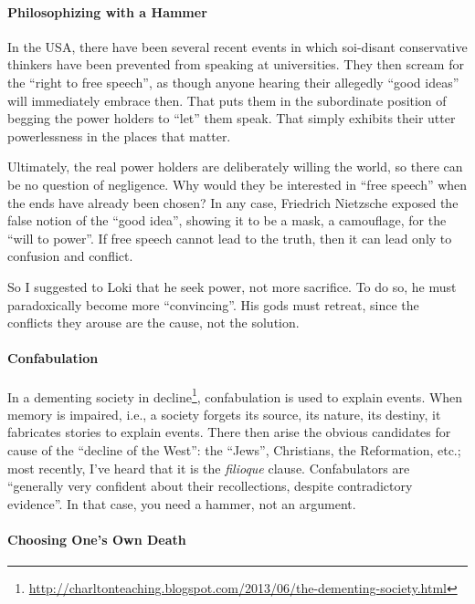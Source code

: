 \paragraph{Philosophizing with a Hammer}


In the USA, there have been several recent events in which soi-disant conservative thinkers have been prevented from speaking at universities. They then scream for the ``right to free speech'', as though anyone hearing their allegedly ``good ideas'' will immediately embrace then. That puts them in the subordinate position of begging the power holders to ``let'' them speak. That simply exhibits their utter powerlessness in the places that matter.

Ultimately, the real power holders are deliberately willing the world, so there can be no question of negligence. Why would they be interested in ``free speech'' when the ends have already been chosen? In any case, Friedrich Nietzsche exposed the false notion of the ``good idea'', showing it to be a mask, a camouflage, for the ``will to power''. If free speech cannot lead to the truth, then it can lead only to confusion and conflict.

So I suggested to Loki that he seek power, not more sacrifice. To do so, he must paradoxically become more ``convincing''. His gods must retreat, since the conflicts they arouse are the cause, not the solution.

\paragraph{Confabulation}


In a dementing society in decline\footnote{\url{http://charltonteaching.blogspot.com/2013/06/the-dementing-society.html}}, confabulation is used to explain events. When memory is impaired, i.e., a society forgets its source, its nature, its destiny, it fabricates stories to explain events. There then arise the obvious candidates for cause of the ``decline of the West'': the ``Jews'', Christians, the Reformation, etc.; most recently, I've heard that it is the \emph{filioque} clause. Confabulators are ``generally very confident about their recollections, despite contradictory evidence''. In that case, you need a hammer, not an argument.

\paragraph{Choosing One's Own Death}


